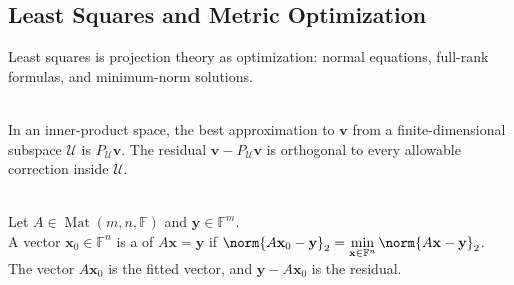 \subsection{Least Squares and Metric Optimization}


%

Least squares is projection theory as optimization: normal equations, full-rank formulas, and minimum-norm solutions.

\begin{principle} \label{pri:least-squares-projection-principle} \\
In an inner-product space, the best approximation to $\mathbf{v}$ from a finite-dimensional subspace $\mathcal{U}$ is $P_{\mathcal{U}}\mathbf{v}$. The residual $\mathbf{v}-P_{\mathcal{U}}\mathbf{v}$ is orthogonal to every allowable correction inside $\mathcal{U}$.
\end{principle}

\begin{definition} \label{def:matrix-least-squares-solution} \\
Let $A\in\operatorname{Mat}(m,n,\mathbb{F})$ and $\mathbf{y}\in\mathbb{F}^m$.\\
A vector $\mathbf{x}_0\in\mathbb{F}^n$ is a  of $A\mathbf{x}=\mathbf{y}$ if $\norm{A\mathbf{x}_0-\mathbf{y}}_2=\min\limits_{\mathbf{x}\in\mathbb{F}^n}\norm{A\mathbf{x}-\mathbf{y}}_2$.\\
The vector $A\mathbf{x}_0$ is the fitted vector, and $\mathbf{y}-A\mathbf{x}_0$ is the residual.
\end{definition}

